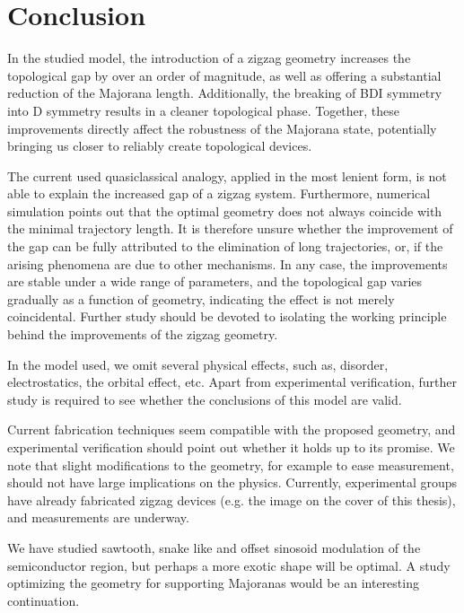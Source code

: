 \chapter{Conclusion}
In the studied model, the introduction of a zigzag geometry increases the topological gap by over an order of magnitude, as well as offering a substantial reduction of the Majorana length.
Additionally, the breaking of BDI symmetry into D symmetry results in a cleaner topological phase.
Together, these improvements directly affect the robustness of the Majorana state, potentially bringing us closer to reliably create topological devices.

The current used quasiclassical analogy, applied in the most lenient form, is not able to explain the increased gap of a zigzag system.
Furthermore, numerical simulation points out that the optimal geometry does not always coincide with the minimal trajectory length.
It is therefore unsure whether the improvement of the gap can be fully attributed to the elimination of long trajectories, or, if the arising phenomena are due to other mechanisms.
In any case, the improvements are stable under a wide range of parameters, and the topological gap varies gradually as a function of geometry, indicating the effect is not merely coincidental.
Further study should be devoted to isolating the working principle behind the improvements of the zigzag geometry.

In the model used, we omit several physical effects, such as, disorder, electrostatics, the orbital effect, etc.
Apart from experimental verification, further study is required to see whether the conclusions of this model are valid.

Current fabrication techniques seem compatible with the proposed geometry, and experimental verification should point out whether it holds up to its promise.
We note that slight modifications to the geometry, for example to ease measurement, should not have large implications on the physics.
Currently, experimental groups have already fabricated zigzag devices (e.g. the image on the cover of this thesis), and measurements are underway.

We have studied sawtooth, snake like and offset sinosoid modulation of the semiconductor region, but perhaps a more exotic shape will be optimal.
A study optimizing the geometry for supporting Majoranas would be an interesting continuation.
